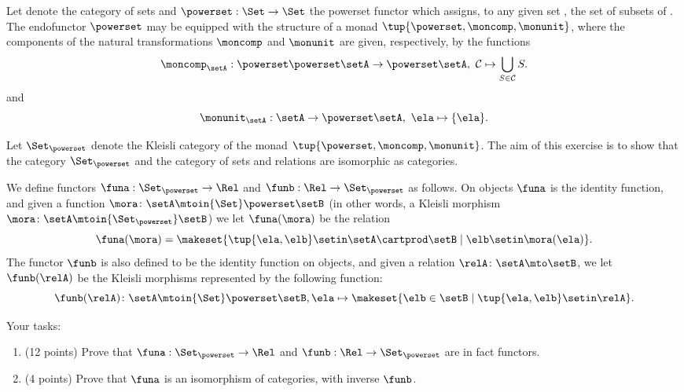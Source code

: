 \begin{gradedexercise}
    \label{ex:HwkRelKleisli}

    Let \Set denote the category of sets and $\powerset : \Set \to \Set$ the powerset functor which assigns, to any given set \setA, the set of subsets of \setA.
    The endofunctor $\powerset$ may be equipped with the structure of a monad $\tup{\powerset, \moncomp, \monunit}$, where the components of the natural transformations $\moncomp$ and $\monunit$ are given, respectively, by the functions
    \begin{equation}
        \moncomp_{\setA} : \powerset \powerset \setA \to \powerset \setA, \ \mathcal{C} \mapsto \bigcup_{S \in \mathcal{C}} S.
    \end{equation}
    and
    \begin{equation}
        \monunit_{\setA} : \setA \to \powerset \setA, \ \ela \mapsto \{ \ela \}.
    \end{equation}

    Let $\Set_{\powerset}$ denote the Kleisli category of the monad $\tup{\powerset, \moncomp, \monunit}$.
    The aim of this exercise is to show that the category $\Set_{\powerset}$ and the category \Rel of sets and relations are isomorphic as categories.

    We define functors $\funa: \Set_{\powerset} \to \Rel$ and $\funb: \Rel \to \Set_{\powerset}$ as follows.
    On objects $\funa$ is the identity function, and given a function $\mora \colon \setA \mtoin{\Set} \powerset \setB$ (in other words, a Kleisli morphism $\mora \colon \setA \mtoin{\Set_{\powerset}} \setB$) we let $\funa(\mora)$ be the relation
    \begin{equation}
        \funa(\mora) = \makeset{\tup{\ela, \elb} \setin \setA \cartprod \setB \mid \elb \setin \mora(\ela)}.
    \end{equation}
    The functor $\funb$ is also defined to be the identity function on objects, and given a relation $\relA \colon \setA \mto \setB$, we let $\funb(\relA)$ be the Kleisli morphisms represented by the following function:
    \begin{equation}
        \funb(\relA)\colon \setA \mtoin{\Set} \powerset \setB, \ela \mapsto \makeset{\elb \in \setB \mid \tup{\ela, \elb} \setin \relA}.
    \end{equation}

    Your tasks:
    \begin{enumerate}
        \item (12 points) Prove that $\funa: \Set_{\powerset} \to \Rel$ and $\funb: \Rel \to \Set_{\powerset}$ are in fact functors.
        \item (4 points) Prove that $\funa$ is an isomorphism of categories, with inverse $\funb$.
    \end{enumerate}
\end{gradedexercise}

